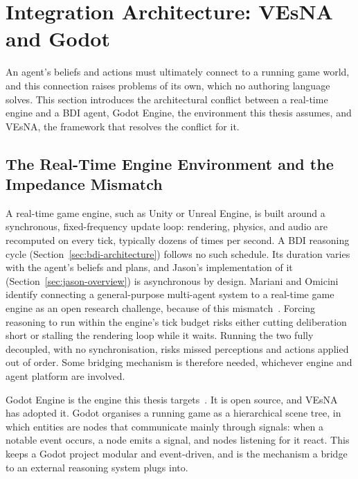  
\section{Integration Architecture: VEsNA and Godot}
\label{sec:integration-architecture}
 
An agent's beliefs and actions must ultimately connect to a running game world, and this connection raises problems of its own, which no authoring language solves. This section introduces the architectural conflict between a real-time engine and a BDI agent, Godot Engine, the environment this thesis assumes, and VEsNA, the framework that resolves the conflict for it.
 
\subsection{The Real-Time Engine Environment and the Impedance Mismatch}
\label{sec:godot-mismatch}
 
A real-time game engine, such as Unity or Unreal Engine, is built around a synchronous, fixed-frequency update loop: rendering, physics, and audio are recomputed on every tick, typically dozens of times per second. A BDI reasoning cycle (Section~\ref{sec:bdi-architecture}) follows no such schedule. Its duration varies with the agent's beliefs and plans, and Jason's implementation of it (Section~\ref{sec:jason-overview}) is asynchronous by design. Mariani and Omicini identify connecting a general-purpose multi-agent system to a real-time game engine as an open research challenge, because of this mismatch~\cite{Mariani2016}. Forcing reasoning to run within the engine's tick budget risks either cutting deliberation short or stalling the rendering loop while it waits. Running the two fully decoupled, with no synchronisation, risks missed perceptions and actions applied out of order. Some bridging mechanism is therefore needed, whichever engine and agent platform are involved.
 
Godot Engine is the engine this thesis targets~\cite{GodotEngine}. It is open source, and VEsNA has adopted it. Godot organises a running game as a hierarchical scene tree, in which entities are nodes that communicate mainly through signals: when a notable event occurs, a node emits a signal, and nodes listening for it react. This keeps a Godot project modular and event-driven, and is the mechanism a bridge to an external reasoning system plugs into.
 

